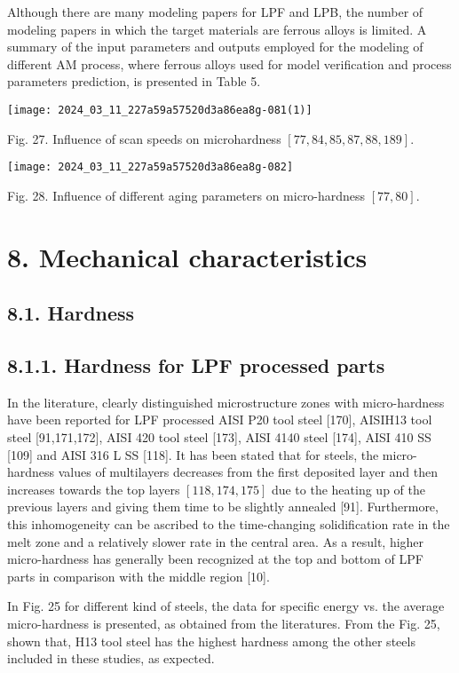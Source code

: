 \documentclass[10pt]{article}
\begin{document}
Although there are many modeling papers for LPF and LPB, the number of modeling papers in which the target materials are ferrous alloys is limited. A summary of the input parameters and outputs employed for the modeling of different AM process, where ferrous alloys used for model verification and process parameters prediction, is presented in Table 5.

\begin{center}
\texttt{[image: 2024\_03\_11\_227a59a57520d3a86ea8g-081(1)]}
\end{center}

Fig. 27. Influence of scan speeds on microhardness $[77,84,85,87,88,189]$.

\begin{center}
\texttt{[image: 2024\_03\_11\_227a59a57520d3a86ea8g-082]}
\end{center}

Fig. 28. Influence of different aging parameters on micro-hardness $[77,80]$.

\section*{8. Mechanical characteristics}
\subsection*{8.1. Hardness}
\subsection*{8.1.1. Hardness for LPF processed parts}
In the literature, clearly distinguished microstructure zones with micro-hardness have been reported for LPF processed AISI P20 tool steel [170], AISIH13 tool steel [91,171,172], AISI 420 tool steel [173], AISI 4140 steel [174], AISI 410 SS [109] and AISI 316 L SS [118]. It has been stated that for steels, the micro-hardness values of multilayers decreases from the first deposited layer and then increases towards the top layers $[118,174,175]$ due to the heating up of the previous layers and giving them time to be slightly annealed [91]. Furthermore, this inhomogeneity can be ascribed to the time-changing solidification rate in the melt zone and a relatively slower rate in the central area. As a result, higher micro-hardness has generally been recognized at the top and bottom of LPF parts in comparison with the middle region [10].

In Fig. 25 for different kind of steels, the data for specific energy vs. the average micro-hardness is presented, as obtained from the literatures. From the Fig. 25, shown that, H13 tool steel has the highest hardness among the other steels included in these studies, as expected.
\end{document}
